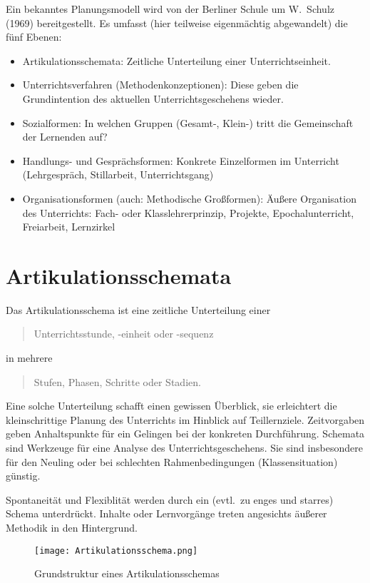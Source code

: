 Ein bekanntes Planungsmodell wird von der Berliner Schule um
W.\ Schulz (1969) bereitgestellt.
Es umfasst (hier teilweise eigenm\"{a}chtig abgewandelt) die
f\"{u}nf Ebenen:
\begin{itemize}
	\item
	Artikulationsschemata: Zeitliche Unterteilung
	einer Unterrichtseinheit.
	\item
	Unterrichtsverfahren (Methodenkonzeptionen):
	Diese geben die Grundintention des aktuellen Unterrichtsgeschehens
	wieder.
	\item
	Sozialformen:
	In welchen Gruppen (Gesamt-, Klein-) tritt die Gemeinschaft der Lernenden auf?
	\item
	Handlungs- und Gespr\"{a}chsformen: Konkrete Einzelformen im
	Unterricht (Lehrgespr\"{a}ch, Stillarbeit, Unterrichtsgang)
	\item
	Organisationsformen (auch: Methodische Gro{\ss}formen):
	\"{A}u{\ss}ere Organisation des Unterrichts: Fach-
	oder Klasslehrerprinzip, Projekte, Epochalunterricht,
	Freiarbeit, Lernzirkel
\end{itemize}

\bip\bip
\section{Artikulationsschemata}


Das Artikulationsschema ist eine zeitliche Unterteilung einer
\begin{quote}
	Unterrichtsstunde, -einheit oder -sequenz
\end{quote}
in mehrere
\begin{quote}
	Stufen, Phasen, Schritte oder Stadien.
\end{quote}

 Eine solche Unterteilung schafft einen gewissen
\"{U}berblick, sie erleichtert die kleinschrittige Planung des
Unterrichts im Hinblick auf Teillernziele.
Zeitvorgaben geben Anhaltspunkte f\"{u}r ein Gelingen bei der
konkreten Durchf\"{u}hrung.
Schemata sind Werkzeuge f\"{u}r eine Analyse des
Unterrichtsgeschehens.
Sie sind insbesondere f\"{u}r den Neuling oder bei schlechten
Rahmenbedingungen (Klassensituation) g\"{u}nstig.

 Spontaneit\"{a}t und Flexiblit\"{a}t werden durch ein
(evtl.\ zu enges und starres) Schema unterdr\"{u}ckt.
Inhalte oder Lernvorg\"{a}nge treten angesichts \"{a}u{\ss}erer
Methodik in den Hintergrund.

\begin{figure}[b]
	\centering
	\texttt{[image: Artikulationsschema.png]}
	\caption{Grundstruktur eines Artikulationsschemas}
	\label{fig:Artikulationsschema}
\end{figure}


